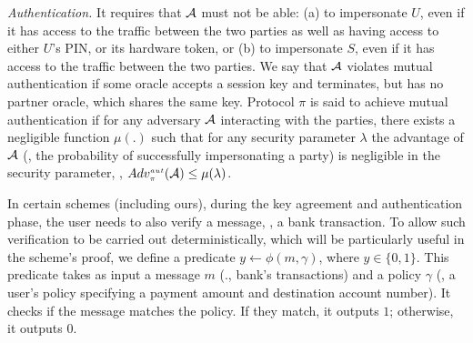 


\noindent\textit{Authentication.} It requires that $\mathcal{A}$ must not be able: (a)  to impersonate $U$, even if it has access to the traffic between the two parties as well as having access to either $U$'s PIN, or its hardware token, or (b) to impersonate  $S$, even if it has access to the traffic between the two parties.   We say that   $\mathcal{A}$  violates mutual authentication if some oracle accepts a session key and terminates, but has no partner oracle, which shares the same key.  Protocol $\pi$ is said to achieve mutual authentication if for any adversary $\mathcal{A}$  interacting with the parties, there exists a negligible function $\mu(.)$ such that for any security parameter $\lambda$ the advantage of $\mathcal{A}$ (\ie, the probability of successfully impersonating a party)  is negligible in the security parameter, \ie, 
%
$Adv_{\scriptscriptstyle\pi}^{\scriptscriptstyle aut}(\mathcal{A})\leq \mu(\lambda)$.


In certain schemes (including ours), during the key agreement and authentication phase, the user needs to also verify a message, \eg, a bank transaction. To allow such verification to be carried out deterministically, which will be particularly useful in the scheme's proof, we define a predicate $y\leftarrow \phi(m, \gamma)$, where $y\in \{0,1\}$. This predicate takes as input a message $m$ (\eg., bank's transactions) and a policy $\gamma$ (\eg, a user's policy specifying a payment amount and destination account number). It checks if the message matches the policy. If they match, it outputs $1$; otherwise, it outputs $0$.  













